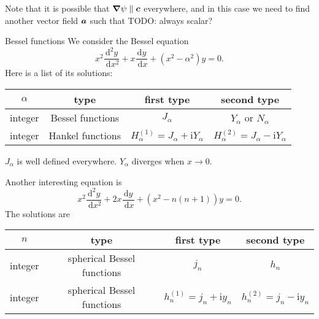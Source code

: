 \documentclass[hyperref, a4paper]{article}
\newcommand*{\ii}{\mathrm{i}}
\begin{document}
Note that it is possible that $\grad {\psi} \parallel \vb*{c}$ everywhere, and in this case we need to 
find another vector field $\vb*{a}$ such that TODO: always scalar?

\begin{info*}{Bessel functions}{}
    We consider the Bessel equation 
    \begin{equation}
        x^{2} \frac{\mathrm{d}^{2} y}{\mathrm{~d} x^{2}}+x \frac{\mathrm{d} y}{\mathrm{~d} x}+\left(x^{2}-\alpha^{2}\right) y=0.
        \label{eq:bessel}
    \end{equation}
    Here is a list of its solutions:
    
    \begin{center}
        \begin{tabular}{cccc}
            \toprule
            $\alpha$ & type & first type & second type \\
            \midrule
            integer & Bessel functions & $J_\alpha$ & $Y_\alpha$ or $N_\alpha$ \\
            integer & Hankel functions & $H_{\alpha}^{(1)}=J_{\alpha}+\mathrm{i} Y_{\alpha}$ & $H_{\alpha}^{(2)}=J_{\alpha}-\mathrm{i} Y_{\alpha}$ \\
            \bottomrule
        \end{tabular}
    \end{center}

    $J_\alpha$ is well defined everywhere. $Y_\alpha$ diverges when $x \to 0$.

    Another interesting equation is
    \begin{equation}
        x^{2} \frac{\mathrm{d}^{2} y}{\mathrm{~d} x^{2}}+ 2x \frac{\mathrm{d} y}{\mathrm{~d} x}+\left(x^{2}-n(n+1)\right) y=0.
    \end{equation}
    The solutions are
    \begin{center}
        \begin{tabular}{cccc}
            \toprule
            $n$ & type & first type & second type \\
            \midrule
            integer & spherical Bessel functions & $j_n$ & $h_n$  \\
            integer & spherical Bessel functions & $h^{(1)}_n = j_n + \ii y_n$ & $h^{(2)}_n = j_n - \ii y_n$  \\
            \bottomrule
        \end{tabular}
    \end{center}
    

\end{info*}
\end{document}
